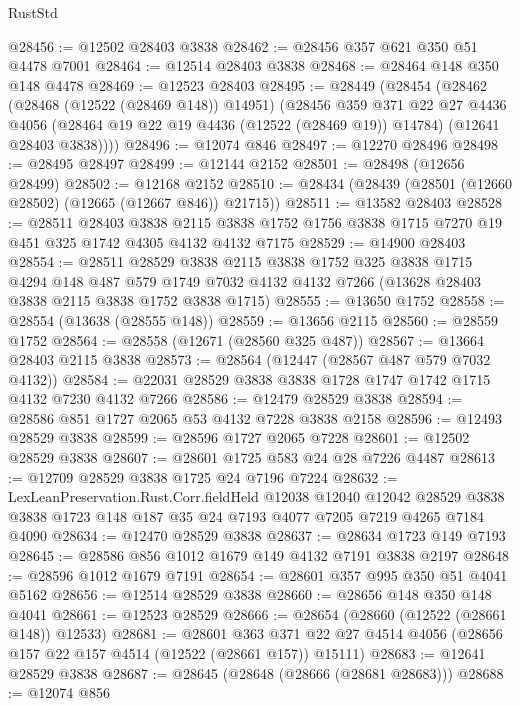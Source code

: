 \begin{lexlean}{RustStd}
\begin{coremodule}
@28456 := @12502 @28403 @3838
@28462 := @28456 @357 @621 @350 @51 @4478 @7001
@28464 := @12514 @28403 @3838
@28468 := @28464 @148 @350 @148 @4478
@28469 := @12523 @28403
@28495 := @28449
    (@28454
      (@28462
        (@28468 (@12522 (@28469 @148)) @14951)
        (@28456
          @359
          @371
          @22
          @27
          @4436
          @4056
          (@28464 @19 @22 @19 @4436 (@12522 (@28469 @19)) @14784)
          (@12641 @28403 @3838))))
@28496 := @12074 @846
@28497 := @12270 @28496
@28498 := @28495 @28497
@28499 := @12144 @2152
@28501 := @28498 (@12656 @28499)
@28502 := @12168 @2152
@28510 := @28434 (@28439 (@28501 (@12660 @28502) (@12665 (@12667 @846)) @21715))
@28511 := @13582 @28403
@28528 := @28511
    @28403
    @3838
    @2115
    @3838
    @1752
    @1756
    @3838
    @1715
    @7270
    @19
    @451
    @325
    @1742
    @4305
    @4132
    @4132
    @7175
@28529 := @14900 @28403
@28554 := @28511
    @28529
    @3838
    @2115
    @3838
    @1752
    @325
    @3838
    @1715
    @4294
    @148
    @487
    @579
    @1749
    @7032
    @4132
    @4132
    @7266
    (@13628 @28403 @3838 @2115 @3838 @1752 @3838 @1715)
@28555 := @13650 @1752
@28558 := @28554 (@13638 (@28555 @148))
@28559 := @13656 @2115
@28560 := @28559 @1752
@28564 := @28558 (@12671 (@28560 @325 @487))
@28567 := @13664 @28403 @2115 @3838
@28573 := @28564 (@12447 (@28567 @487 @579 @7032 @4132))
@28584 := @22031 @28529 @3838 @3838 @1728 @1747 @1742 @1715 @4132 @7230 @4132 @7266
@28586 := @12479 @28529 @3838
@28594 := @28586 @851 @1727 @2065 @53 @4132 @7228 @3838 @2158
@28596 := @12493 @28529 @3838
@28599 := @28596 @1727 @2065 @7228
@28601 := @12502 @28529 @3838
@28607 := @28601 @1725 @583 @24 @28 @7226 @4487
@28613 := @12709 @28529 @3838 @1725 @24 @7196 @7224
@28632 := LexLeanPreservation.Rust.Corr.fieldHeld
    @12038
    @12040
    @12042
    @28529
    @3838
    @3838
    @1723
    @148
    @187
    @35
    @24
    @7193
    @4077
    @7205
    @7219
    @4265
    @7184
    @4090
@28634 := @12470 @28529 @3838
@28637 := @28634 @1723 @149 @7193
@28645 := @28586 @856 @1012 @1679 @149 @4132 @7191 @3838 @2197
@28648 := @28596 @1012 @1679 @7191
@28654 := @28601 @357 @995 @350 @51 @4041 @5162
@28656 := @12514 @28529 @3838
@28660 := @28656 @148 @350 @148 @4041
@28661 := @12523 @28529
@28666 := @28654 (@28660 (@12522 (@28661 @148)) @12533)
@28681 := @28601
    @363
    @371
    @22
    @27
    @4514
    @4056
    (@28656 @157 @22 @157 @4514 (@12522 (@28661 @157)) @15111)
@28683 := @12641 @28529 @3838
@28687 := @28645 (@28648 (@28666 (@28681 @28683)))
@28688 := @12074 @856

\end{coremodule}
\end{lexlean}
